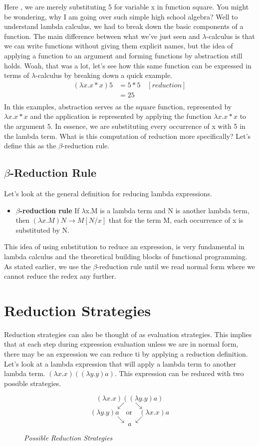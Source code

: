\documentclass{article}
\begin{document}
\medskip\noindent
Here , we are merely substituting 5 for variable x in function square. You might be wondering, why I am going over such simple high school algebra? Well to understand lambda calculus, we had to break down the basic components of a function. The main difference between what we’ve just seen and $\lambda$-calculus is that we can write functions without giving them explicit names, but the idea of applying a function to an argument and forming functions by abstraction still holds. Woah, that was a lot, let’s see how this same function can be expressed in terms of $\lambda$-calculus by breaking down a quick example. 
\begin{align*}
(\lambda x.x*x ) 5 &=5*5  \quad [reduction] \\
&=25 \\
\end{align*}
In this examples, abstraction serves as the square function, represented by $\lambda x.x*x$ and the application is represented by applying the function  $\lambda x.x*x$ to the argument $5$. In essence, we are substituting every occurrence of x with 5 in the lambda term. What is this computation of reduction more specifically? Let’s define this as the $\beta$-reduction rule.



\subsection{$\beta$-Reduction Rule}
Let’s look at the general definition for reducing lambda expressions.

\begin{itemize}
\item \textbf{$\beta$-reduction rule} If $\lambda$x.M is a lambda term and N is another lambda term, then $(\lambda x.M ) N  \rightarrow M[N/x]$
that for the term M, each occurrence of x is substituted by N. 
\end{itemize}
This idea of using substitution to reduce an expression, is very fundamental in lambda calculus and the theoretical building blocks of functional programming. As stated earlier, we use the $\beta$-reduction rule until we read normal form where we cannot reduce the redex any further. 

\section{Reduction Strategies}
Reduction strategies can also be thought of as evaluation strategies. This implies that at each step during expression evaluation unless we are in normal form, there may be an expression we can reduce ti by applying a reduction definition. Let’s look at a lambda expression that will apply a lambda term to another lambda term. $(\lambda x.x) ((\lambda y.y) a)$. This expression can be reduced with two possible strategies. 
\begin{figure}[!htb]
$$(\lambda x.x) ((\lambda y.y) a)$$
$$\swarrow \quad \searrow$$
$$(\lambda y.y)a \quad \textrm{or} \quad (\lambda x.x)a$$
$$\searrow \quad \swarrow$$
$$a$$
 \caption{\textit{Possible Reduction Strategies}}
 \label{fig:my_label}

\end{figure}
\end{document}
